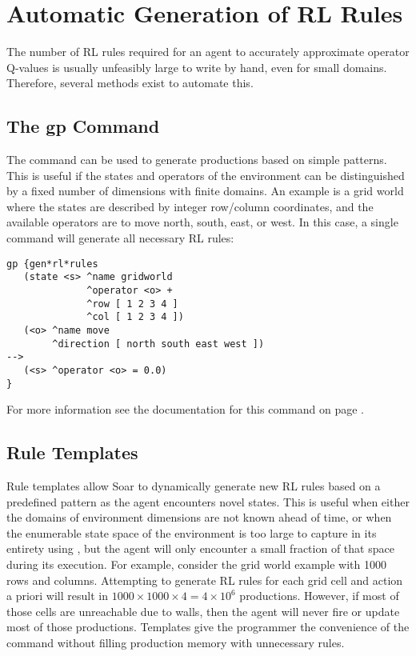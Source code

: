 \section{Automatic Generation of RL Rules}

The number of RL rules required for an agent to accurately approximate operator Q-values is usually unfeasibly large to write by hand, even for small domains.
Therefore, several methods exist to automate this.

\subsection{The gp Command}
The  command can be used to generate productions based on simple patterns.
This is useful if the states and operators of the environment can be distinguished by a fixed number of dimensions with finite domains.
An example is a grid world where the states are described by integer row/column coordinates, and the available operators are to move north, south, east, or west.
In this case, a single  command will generate all necessary RL rules:
	
\begin{verbatim}
gp {gen*rl*rules
   (state <s> ^name gridworld
              ^operator <o> +
              ^row [ 1 2 3 4 ]
              ^col [ 1 2 3 4 ])
   (<o> ^name move
        ^direction [ north south east west ])
-->
   (<s> ^operator <o> = 0.0)
}
\end{verbatim}
	
For more information see the documentation for this command on page \pageref{gp}.

\subsection{Rule Templates}
\label{RL-templates}

Rule templates allow Soar to dynamically generate new RL rules based on a predefined pattern as the agent encounters novel states.
This is useful when either the domains of environment dimensions are not known ahead of time, or when the enumerable state space of the environment is too large to capture in its entirety using , but the agent will only encounter a small fraction of that space during its execution.
For example, consider the grid world example with 1000 rows and columns.
Attempting to generate RL rules for each grid cell and action a priori will result in $1000 \times 1000 \times 4 = 4 \times 10^6$ productions.
However, if most of those cells are unreachable due to walls, then the agent will never fire or update most of those productions.
Templates give the programmer the convenience of the  command without filling production memory with unnecessary rules.

